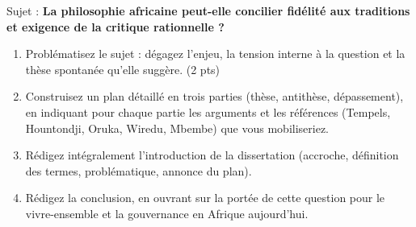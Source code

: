 \documentclass[11pt]{article}
\begin{document}
\begin{exercice}
Sujet : \textbf{La philosophie africaine peut-elle concilier fidélité aux traditions et exigence de la critique rationnelle ?}
\begin{enumerate}
\item Problématisez le sujet : dégagez l'enjeu, la tension interne à la question et la thèse spontanée qu'elle suggère. (2 pts)
\item Construisez un plan détaillé en trois parties (thèse, antithèse, dépassement), en indiquant pour chaque partie les arguments et les références (Tempels, Hountondji, Oruka, Wiredu, Mbembe) que vous mobiliseriez.
\item Rédigez intégralement l'introduction de la dissertation (accroche, définition des termes, problématique, annonce du plan).
\item Rédigez la conclusion, en ouvrant sur la portée de cette question pour le vivre-ensemble et la gouvernance en Afrique aujourd'hui.
\end{enumerate}
\end{exercice}
\end{document}
